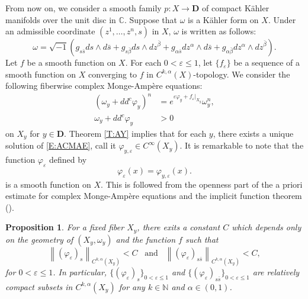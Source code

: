 \documentclass{amsart}
\newtheorem{proposition}[theorem]{Proposition}
\theoremstyle{definition}
\numberwithin{equation}{section}
\begin{document}
From now on, we consider a smooth family $p:X\rightarrow{\mathbf{D}}$ of compact K\"ahler manifolds over the unit disc in ${\mathbb{C}}$. Suppose that $\omega$ is a K\"ahler form on $X$. Under an admissible coordinate $(z^1,\dots,z^n,s)$ in $X$, $\omega$ is written as follows:
\begin{equation*}
\omega
=
{\sqrt{-1}}{\left({g_{s\bar s}ds\wedge d\bar s
+g_{s\bar\beta}ds\wedge{dz}^{\bar\beta} 
+g_{\alpha\bar s}dz^\alpha\wedge d\bar s
+g_{\alpha\bar\beta}dz^\alpha\wedge{dz}^{\bar\beta}
}\right)}.
\end{equation*}
Let $f$ be a smooth function on $X$. For each $0<{\varepsilon}\le1$, let $\{f_{\varepsilon}\}$ be a sequence of a smooth function on $X$ converging to $f$ in $C^{k,\alpha}(X)$-topology. We consider the following fiberwise complex Monge-Amp\`ere equations:
\begin{equation} \label{E:ACMAE}
\begin{aligned}
{\left({\omega_y+dd^c{\varphi}_y}\right)}^n
&=
e^{{\varepsilon}{\varphi}_y+f_{\varepsilon}\vert_{X_y}}\omega_y^n,
\\
\omega_y+dd^c{\varphi}_y
&>0
\end{aligned}
\end{equation}
on $X_y$ for $y\in{\mathbf{D}}$. Theorem \ref{T:AY} implies that for each $y$, there exists a unique solution of \eqref{E:ACMAE}, call it ${\varphi}_{y,{\varepsilon}}\in C^\infty(X_y)$. It is remarkable to note that the function ${\varphi}_{\varepsilon}$ defined by 
\begin{equation*}
{\varphi}_{\varepsilon}(x)={\varphi}_{y,{\varepsilon}}(x).
\end{equation*}
is a smooth function on $X$. This is followed from the openness part of the a priori estimate for complex Monge-Amp\`ere equations and the implicit function theorem (\cite{Yau}).

\begin{proposition}\label{P:approximation2}
For a fixed fiber $X_y$, there exits a constant $C$ which depends only on the geometry of $(X_y,\omega_y)$ and the function $f$ such that
\begin{equation*}
{\left\|{({\varphi}_{\varepsilon})_s}\right\|}_{C^{k,\alpha}(X_y)}<C
\;\;\;\text{and}\;\;\;
{\left\|{({\varphi}_{\varepsilon})_{s\bar s}}\right\|}_{C^{k,\alpha}(X_y)}<C,
\end{equation*}
for $0<{\varepsilon}\le1$. In particular, $\{({\varphi}_{\varepsilon})_s\}_{0<{\varepsilon}\le1}$ and $\{({\varphi}_{\varepsilon})_{s\bar s}\}_{0<{\varepsilon}\le1}$ are relatively compact subsets in $C^{k,\alpha}(X_y)$ for any $k\in{\mathbb{N}}$ and $\alpha\in(0,1)$.
\end{proposition}
\end{document}
